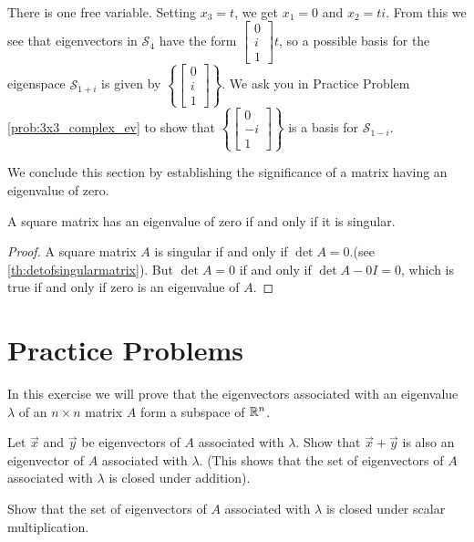 \documentclass{ximera}
\begin{document}
\begin{example}
\begin{explanation}
\begin{align*}
\end{align*}
There is one free variable.  Setting $x_3=t$, we get $x_1=0$ and $x_2=ti$.  From this we see that eigenvectors in $\mathcal{S}_4$ have the form $\begin{bmatrix}0\\i\\1\end{bmatrix}t$, so a possible basis for the eigenspace $\mathcal{S}_{1+i}$ is given by $\left\{\begin{bmatrix}0\\i\\1\end{bmatrix}\right\}$.
We ask you in Practice Problem \ref{prob:3x3_complex_ev} to show that $\left\{\begin{bmatrix}0\\-i\\1\end{bmatrix}\right\}$ is a basis for $\mathcal{S}_{1-i}$.
\end{explanation}
\end{example}

We conclude this section by establishing the significance of a matrix having an eigenvalue of zero.

\begin{theorem}\label{th:zero_ew}
A square matrix has an eigenvalue of zero if and only if it is singular.
\end{theorem}

\begin{proof}
A square matrix $A$ is singular if and only if $\det{A}=0$.(see  \ref{th:detofsingularmatrix}).  But $\det{A}=0$ if and only if $\det{A-0I}=0$, which is true if and only if zero is an eigenvalue of $A$.
\end{proof}

\section*{Practice Problems}

\begin{problem}
In this exercise we will prove that the eigenvectors associated with an eigenvalue $\lambda$ of an $n \times n$ matrix $A$ form a subspace of $\mathbb{R}^n$.
\begin{problem}\label{prob:eigenspace1}
Let $\vec{x}$ and $\vec{y}$ be eigenvectors of $A$ associated with $\lambda$.  Show that $\vec{x}+\vec{y}$ is also an eigenvector of $A$ associated with $\lambda$.  (This shows that the set of eigenvectors of $A$ associated with $\lambda$ is closed under addition).
\end{problem}
\begin{problem}\label{prob:eigenspace2}
Show that the set of eigenvectors of $A$ associated with $\lambda$ is closed under scalar multiplication.
\end{problem}
\end{problem}
\end{document}
